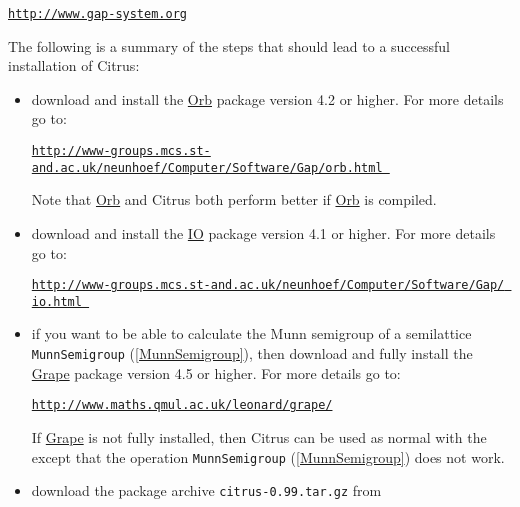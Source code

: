 \documentclass[a4paper,11pt]{report}
\begin{document}
{{\noindent\vspace{\baselineskip} \href{http://www.gap-system.org} {\texttt{http://www.gap-system.org}}

 \noindent The following is a summary of the steps that should lead to a successful
installation of \textsf{Citrus}: 
\begin{itemize}
\item  download and install the \href{ http://www-groups.mcs.st-and.ac.uk/~neunhoef/Computer/Software/Gap/orb.html } {Orb} package version 4.2 or higher. For more details go to: \vspace{\baselineskip}

\noindent \href{http://www-groups.mcs.st-and.ac.uk/~neunhoef/Computer/Software/Gap/orb.html } {\texttt{http://www-groups.mcs.st-and.ac.uk/\texttt{}neunhoef/Computer/Software/Gap/orb.html }}

 \noindent Note that \href{ http://www-groups.mcs.st-and.ac.uk/~neunhoef/Computer/Software/Gap/orb.html } {Orb} and \textsf{Citrus} both perform better if \href{ http://www-groups.mcs.st-and.ac.uk/~neunhoef/Computer/Software/Gap/orb.html } {Orb} is compiled. 
\item  download and install the \href{ http://www-groups.mcs.st-and.ac.uk/~neunhoef/Computer/Software/Gap/io.html } {IO} package version 4.1 or higher. For more details go to: \vspace{\baselineskip}

\noindent \href{http://www-groups.mcs.st-and.ac.uk/~neunhoef/Computer/Software/Gap/ io.html } {\texttt{http://www-groups.mcs.st-and.ac.uk/\texttt{}neunhoef/Computer/Software/Gap/ io.html }} 
\item  if you want to be able to calculate the Munn semigroup of a semilattice \texttt{MunnSemigroup} (\ref{MunnSemigroup}), then download and fully install the \href{http://www.maths.qmul.ac.uk/~leonard/grape/} {Grape} package version 4.5 or higher. For more details go to:\vspace{\baselineskip}

\noindent \href{http://www.maths.qmul.ac.uk/~leonard/grape/} {\texttt{http://www.maths.qmul.ac.uk/\texttt{}leonard/grape/}}

 If \href{http://www.maths.qmul.ac.uk/~leonard/grape/} {Grape} is not fully installed, then \textsf{Citrus} can be used as normal with the except that the operation \texttt{MunnSemigroup} (\ref{MunnSemigroup}) does not work. 
\item  download the package archive \texttt{citrus-0.99.tar.gz} from \vspace{\baselineskip}


\end{itemize}}}
\end{document}

